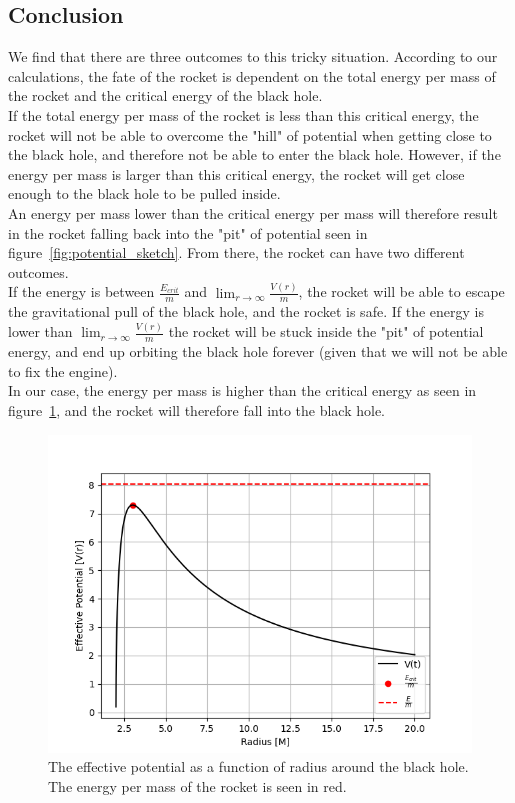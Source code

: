 \documentclass[reprint,english,notitlepage]{revtex4-2}
\begin{document}
    \subsection{Conclusion}\label{subsec:conclusion6}
        We find that there are three outcomes to this tricky situation.
        According to our calculations, the fate of the rocket is dependent on the total energy per mass of the rocket and the critical energy of the black hole.\\

        If the total energy per mass of the rocket is less than this critical energy, the rocket will not be able to overcome the "hill" of potential when getting close to the black hole, and therefore not be able to enter the black hole.
        However, if the energy per mass is larger than this critical energy, the rocket will get close enough to the black hole to be pulled inside.\\
        An energy per mass lower than the critical energy per mass will therefore result in the rocket falling back into the "pit" of potential seen in figure~\ref{fig:potential_sketch}.
        From there, the rocket can have two different outcomes.\\
        If the energy is between $\frac{E_{crit}}{m}$ and $\lim_{r \rightarrow \infty} \frac{V(r)}{m}$, the rocket will be able to escape the gravitational pull of the black hole, and the rocket is safe.
        If the energy is lower than $\lim_{r \rightarrow \infty} \frac{V(r)}{m}$ the rocket will be stuck inside the "pit" of potential energy, and end up orbiting the black hole forever (given that we will not be able to fix the engine).\\

        In our case, the energy per mass is higher than the critical energy as seen in figure~\ref{fig:eff_potential}, and the rocket will therefore fall into the black hole.\\

        \begin{figure}[h]
            \centering
            \includegraphics[scale=0.4]{ex6_effpotential}
            \caption{The effective potential as a function of radius around the black hole. The energy per mass of the rocket is seen in red.}\label{fig:eff_potential}
        \end{figure}
\end{document}
